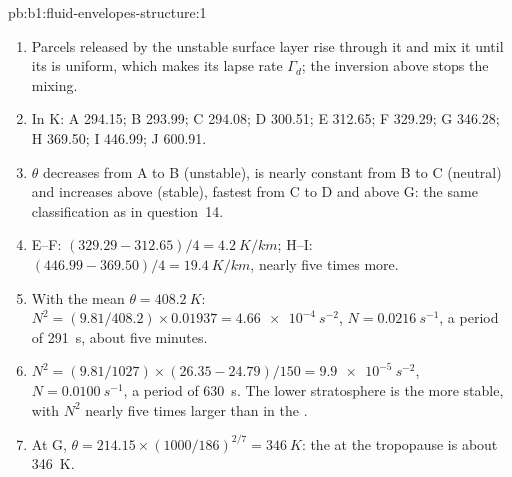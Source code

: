 \begin{solution}{pb:b1:fluid-envelopes-structure:1}
\begin{enumerate}
        stops its rise.
  \item Parcels released by the unstable surface layer rise through it and mix it
        until its  is uniform, which makes its lapse rate
        $\Gamma_d$; the inversion above stops the mixing.
  \item In K: A 294.15; B 293.99; C 294.08; D 300.51; E 312.65; F 329.29; G
        346.28; H 369.50; I 446.99; J 600.91.
  \item $\theta$ decreases from A to B (unstable), is nearly constant from B to
        C (neutral) and increases above (stable), fastest from C to D and above
        G: the same classification as in question~14.
  \item E--F: $(329.29 - 312.65)/4 = \qty{4.2}{K/km}$; H--I: $(446.99 -
        369.50)/4 = \qty{19.4}{K/km}$, nearly five times more.
  \item With the mean $\theta = \qty{408.2}{K}$: $N^2 = (9.81/408.2) \times
        0.01937 = \qty{4.66e-4}{s^{-2}}$, $N = \qty{0.0216}{s^{-1}}$, a period
        of \qty{291}{s}, about five minutes.
  \item $N^2 = (9.81/1027) \times (26.35 - 24.79)/150 = \qty{9.9e-5}{s^{-2}}$,
        $N = \qty{0.0100}{s^{-1}}$, a period of \qty{630}{s}. The lower
        stratosphere is the more stable, with $N^2$ nearly five times larger
        than in the .
  \item At G, $\theta = 214.15 \times (1000/186)^{2/7} = \qty{346}{K}$: the
         at the tropopause is about \qty{346}{K}.
\end{enumerate}
\end{solution}
